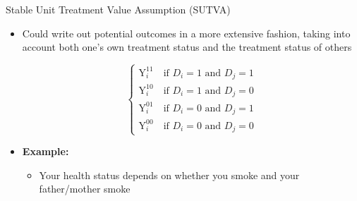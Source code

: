 \documentclass[hyperref={pdfpagelabels=false}]{beamer}
\begin{document}
\begin{frame}{Stable Unit Treatment Value Assumption (SUTVA)}
	
	\begin{itemize} 
		\item  Could write out potential outcomes in a more
		extensive fashion, taking into account both
		one's own treatment status and the treatment
		status of others
		
		\begin{equation*}
		\left\lbrace
		\begin{array}{l}
		\mathrm{Y}^{11}_{i}\quad \text{if $D_i=1$ and $D_j=1$} \\
		\mathrm{Y}^{10}_{i}\quad \text{if $D_i=1$ and $D_j=0$} \\
		\mathrm{Y}^{01}_{i}\quad \text{if $D_i=0$ and $D_j=1$} \\
		\mathrm{Y}^{00}_{i}\quad \text{if $D_i=0$ and $D_j=0$}
		\end{array} \right.
		\end{equation*}
		
		
		\item \textbf{Example:} 
				\vspace{0.2cm}
			\begin{itemize} 
		\item Your health status depends on whether you smoke and your father/mother smoke
			\end{itemize}
	\end{itemize}
\end{frame}
\end{document}
